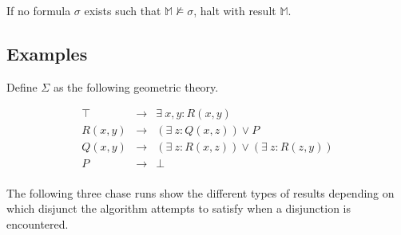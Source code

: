 		If no formula $\sigma$ exists such that $\mathbb{M} \not\models
		\sigma$, halt with result $\mathbb{M}$.

	\subsection{Examples}

		Define $\Sigma$ as the following geometric theory.

		\begin{eqnarray}
			\top    &  \to  &  \exists\ x,y : R(x,y)                             \\
			R(x,y)  &  \to  &  (\exists\ z : Q(x,z)) \vee P                      \\
			Q(x,y)  &  \to  &  (\exists\ z : R(x,z)) \vee (\exists\ z : R(z,y))  \\
			P       &  \to  &  \bot                                              \\
		\end{eqnarray}

		The following three chase runs show the different types of results
		depending on which disjunct the algorithm attempts to satisfy when a
		disjunction is encountered.

